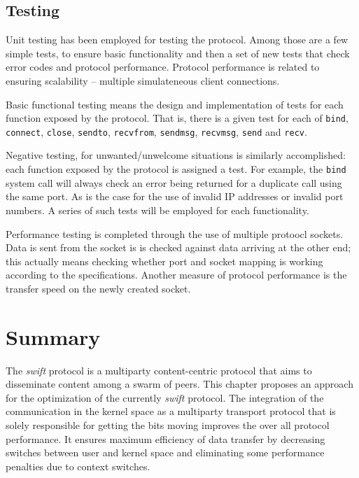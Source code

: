 \subsection{Testing}

Unit testing has been employed for testing the protocol. Among those are a few
simple tests, to ensure basic functionality and then a set of new tests that
check error codes and protocol performance. Protocol performance is related to
ensuring scalability -- multiple simulateneous client connections.

Basic functional testing means the design and implementation of tests for each
function exposed by the protocol. That is, there is a given test for each of
\texttt{bind}, \texttt{connect}, \texttt{close}, \texttt{sendto},
\texttt{recvfrom}, \texttt{sendmsg}, \texttt{recvmsg}, \texttt{send} and
\texttt{recv}.

Negative testing, for unwanted/unwelcome situations is similarly accomplished:
each function exposed by the protocol is assigned a test. For example, the
\texttt{bind} system call will always check an error being returned for a
duplicate call using the same port. As is the case for the use of invalid IP
addresses or invalid port numbers. A series of such tests will be employed for
each functionality.

Performance testing is completed through the use of multiple protoocl sockets.
Data is sent from the socket is is checked against data arriving at the other
end; this actually means checking whether port and socket mapping is working
according to the specifications. Another measure of protocol performance is
the transfer speed on the newly created socket.

\section{Summary}
\label{sec:multiparty:summary}

The \textit{swift} protocol is a multiparty content-centric protocol that aims
to disseminate content among a swarm of peers. This chapter proposes an
approach for the optimization of the currently \textit{swift} protocol. The
integration of the communication in the kernel space as a multiparty transport
protocol that is solely responsible for getting the bits moving improves the
over all protocol performance. It ensures maximum efficiency of data transfer
by decreasing switches between user and kernel space and eliminating some
performance penalties due to context switches.

